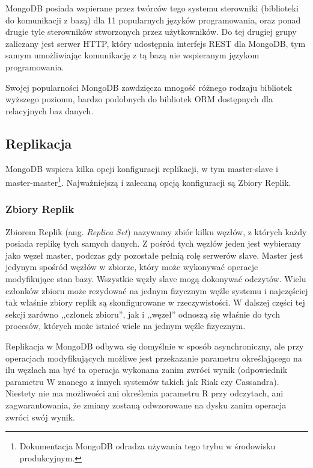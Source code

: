 MongoDB posiada wspierane przez twórców tego systemu sterowniki (biblioteki do komunikacji z bazą) dla 11 popularnych języków programowania, oraz ponad drugie tyle sterowników stworzonych przez użytkowników.
Do tej drugiej grupy zaliczany jest serwer HTTP, który udostępnia interfejs REST dla MongoDB, tym samym umożliwiając komunikację z tą bazą nie wspieranym językom programowania.

Swojej popularności MongoDB zawdzięcza mnogość różnego rodzaju bibliotek wyższego poziomu, bardzo podobnych do bibliotek ORM dostępnych dla relacyjnych baz danych.

\subsection*{Replikacja}
\label{sec:mongodb-replication}

MongoDB wspiera kilka opcji konfiguracji replikacji, w tym master-slave i master-master\footnote{Dokumentacja MongoDB odradza używania tego trybu w środowisku produkcyjnym.}.
Najważniejszą i zalecaną opcją konfiguracji są Zbiory Replik.

\subsubsection*{Zbiory Replik}

Zbiorem Replik (ang. \emph{Replica Set}) nazywamy zbiór kilku węzłów, z których każdy posiada replikę tych samych danych.
Z pośród tych węzłów jeden jest wybierany jako węzeł master, podczas gdy pozostałe pełnią rolę serwerów slave.
Master jest jedynym spośród węzłów w zbiorze, który może wykonywać operacje modyfikujące stan bazy.
Wszystkie węzły slave mogą dokonywać odczytów.
Wielu członków zbioru może rezydować na jednym fizycznym węźle systemu i najczęściej tak właśnie zbiory replik są skonfigurowane w rzeczywistości.
W dalszej części tej sekcji zarówno ,,członek zbioru'', jak i ,,węzeł'' odnoszą się właśnie do tych procesów, których może istnieć wiele na jednym węźle fizycznym.

Replikacja w MongoDB odbywa się domyślnie w sposób asynchroniczny, ale przy operacjach modyfikujących możliwe jest przekazanie parametru określającego na ilu węzłach ma być ta operacja wykonana zanim zwróci wynik (odpowiednik parametru W znanego z innych systemów takich jak Riak czy Cassandra).
Niestety nie ma możliwości ani określenia parametru R przy odczytach, ani zagwarantowania, że zmiany zostaną odwzorowane na dysku zanim operacja zwróci swój wynik.

